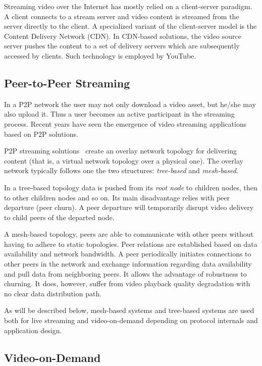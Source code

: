 Streaming video over the Internet has mostly relied on a client-server
paradigm. A client connects to a stream server and video content is streamed
from the server directly to the client. A specialized variant of the
client-server model is the Content Delivery Network (CDN). In CDN-based
solutions, the video source server pushes the content to a set of delivery
servers which are subsequently accessed by clients. Such technology is
employed by YouTube.

\subsection{Peer-to-Peer Streaming}
\label{subsec:p2p-systems:p2p-streaming-p2p}

In a P2P network the user may not only download a video asset, but he/she may
also upload it. Thus a user becomes an active participant in the streaming
process. Recent years have seen the emergence of video streaming applications
based on P2P solutions.

P2P streaming solutions~\cite{p2p-streaming-survey} create an overlay network topology for
delivering content (that is, a virtual network topology over a physical one).
The overlay network typically follows one the two structures:
\textit{tree-based} and \textit{mesh-based}.

In a tree-based topology data is pushed from its \textit{root node} to
children nodes, then to other children nodes and so on. Its main disadvantage
relies with peer departure (peer churn). A peer departure will temporarily
disrupt video delivery to child peers of the departed node.

A mesh-based topology, peers are able to communicate with other peers without
having to adhere to static topologies. Peer relations are established based on
data availability and network bandwidth. A peer periodically initiates
connections to other peers in the network and exchange information regarding
data availability and pull data from neighboring peers. It allows the
advantage of robustness to churning. It does, however, suffer from video
playback quality degradation with no clear data distribution path.

As will be described below, mesh-based systems and tree-based systems are used
both for live streaming and video-on-demand depending on protocol internals
and application design.

\subsection{Video-on-Demand}
\label{subsec:p2p-systems:vod}

